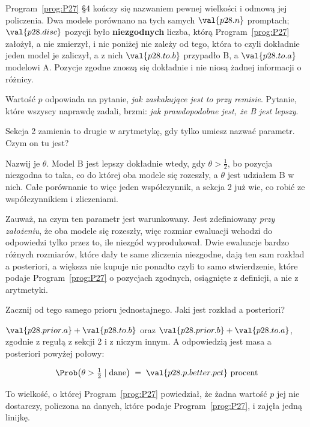 \begin{fr}
Program~\ref{prog:P27} §4 kończy się nazwaniem pewnej wielkości i odmową jej
policzenia. Dwa modele porównano na tych samych $\val{p28.n}$ promptach;
$\val{p28.disc}$ pozycji było \textbf{niezgodnych} \dash{} liczba, którą
Program~\ref{prog:P27} założył, a nie zmierzył, i nic poniżej nie zależy od
tego, która to \dash{} czyli dokładnie jeden model je zaliczył, a z nich
$\val{p28.to.b}$ przypadło B, a
$\val{p28.to.a}$ modelowi A. Pozycje zgodne znoszą się dokładnie i nie niosą
żadnej informacji o różnicy.

Wartość $p$ odpowiada na pytanie, \emph{jak zaskakujące jest to przy remisie}.
Pytanie, które wszyscy naprawdę zadali, brzmi: \emph{jak prawdopodobne jest,
że B jest lepszy}.

Sekcja 2 zamienia to drugie w arytmetykę, gdy tylko umiesz nazwać parametr.
Czym on tu jest?
\dotline
\nextframe
\end{fr}

\begin{fr}

Nazwij je $\theta$. Model B jest lepszy dokładnie wtedy, gdy
$\theta > \frac{1}{2}$, bo pozycja niezgodna to taka, co do której oba modele
się rozeszły, a $\theta$ jest udziałem B w nich. Całe porównanie to więc jeden
współczynnik, a sekcja 2 już wie, co robić ze współczynnikiem i zliczeniami.

Zauważ, na czym ten parametr jest warunkowany. Jest zdefiniowany \emph{przy
założeniu}, że oba modele się rozeszły, więc rozmiar ewaluacji wchodzi do
odpowiedzi tylko przez to, ile niezgód wyprodukował. Dwie ewaluacje bardzo
różnych rozmiarów, które dały te same zliczenia niezgodne, dają ten sam
rozkład a posteriori, a większa nie kupuje nic ponadto \dash{} czyli to samo
stwierdzenie, które podaje Program~\ref{prog:P27} o pozycjach zgodnych,
osiągnięte z definicji, a nie z arytmetyki.

Zacznij od tego samego prioru jednostajnego. Jaki jest rozkład a posteriori?
\dotline
\nextframe
\end{fr}

\begin{fr}

$\val{p28.prior.a}+\val{p28.to.b}$ oraz
$\val{p28.prior.b}+\val{p28.to.a}$, zgodnie z regułą z sekcji 2 i z niczym
innym. A odpowiedzią jest masa a posteriori powyżej połowy:

\[ \Prob\bigl(\theta > \tfrac{1}{2} \mid \text{dane}\bigr)
   \;=\; \val{p28.p.better.pct}\ \text{procent} \]


To wielkość, o której Program~\ref{prog:P27} powiedział, że żadna wartość $p$
jej nie dostarczy, policzona na danych, które podaje
Program~\ref{prog:P27}, i zajęła jedną linijkę.
\end{fr}

